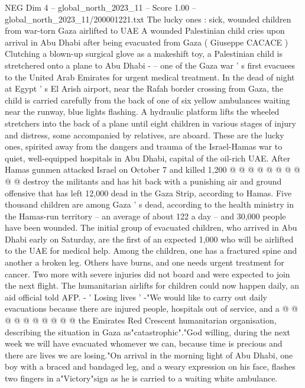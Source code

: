 \begin{textsample}{NEG Dim 4 – global\_north\_2023\_11 – Score 1.00 – global\_north\_2023\_11/200001221.txt}  \label{ex:f4_neg_254}
The lucky ones : sick, wounded children from war-torn Gaza airlifted to UAE A wounded Palestinian child cries upon arrival in Abu Dhabi after being evacuated from Gaza ( Giuseppe CACACE ) Clutching a blown-up surgical glove as a makeshift toy, a Palestinian child is stretchered onto a plane to Abu Dhabi - -- one of the Gaza war ' s first evacuees to the United Arab Emirates for urgent medical treatment.
In the dead of night at Egypt ' s El Arish airport, near the Rafah border crossing from Gaza, the child is carried carefully from the back of one of six yellow ambulances waiting near the runway, blue lights flashing.
A hydraulic platform lifts the wheeled stretchers into the back of a plane until eight children in various stages of injury and distress, some accompanied by relatives, are aboard.
These are the lucky ones, spirited away from the dangers and trauma of the Israel-Hamas war to quiet, well-equipped hospitals in Abu Dhabi, capital of the oil-rich UAE.
After Hamas gunmen attacked Israel on October 7 and killed 1,200 @ @ @ @ @ @ @ @ @ @ destroy the militants and has hit back with a punishing air and ground offensive that has left 12,000 dead in the Gaza Strip, according to Hamas.
Five thousand children are among Gaza ' s dead, according to the health ministry in the Hamas-run territory -- an average of about 122 a day -- and 30,000 people have been wounded.
The initial group of evacuated children, who arrived in Abu Dhabi early on Saturday, are the first of an expected 1,000 who will be airlifted to the UAE for medical help.
Among the children, one has a fractured spine and another a broken leg.
Others have burns, and one needs urgent treatment for cancer.
Two more with severe injuries did not board and were expected to join the next flight.
The humanitarian airlifts for children could now happen daily, an aid official told AFP. - ' Losing lives ' -"We would like to carry out daily evacuations because there are injured people, hospitals out of service, and a @ @ @ @ @ @ @ @ @ @ the Emirates Red Crescent humanitarian organisation, describing the situation in Gaza as"catastrophic"."God willing, during the next week we will have evacuated whomever we can, because time is precious and there are lives we are losing."On arrival in the morning light of Abu Dhabi, one boy with a braced and bandaged leg, and a weary expression on his face, flashes two fingers in a"Victory"sign as he is carried to a waiting white ambulance.

\end{textsample}
